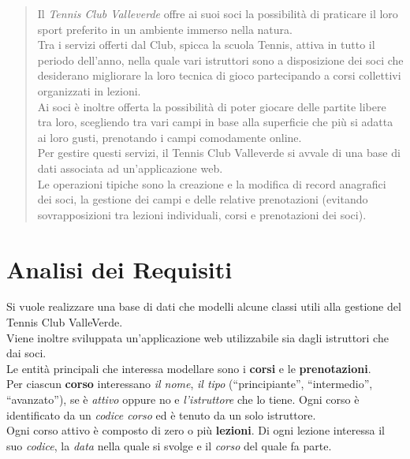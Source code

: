 %
\begin{abstract}
\justify
Il \textit{Tennis Club Valleverde} offre ai suoi soci la possibilità di praticare il loro sport preferito in un ambiente immerso nella natura. \\
Tra i servizi offerti dal Club, spicca la scuola Tennis, attiva in tutto il periodo dell’anno, nella quale vari istruttori sono a  disposizione dei soci che desiderano migliorare la loro tecnica di gioco partecipando a corsi collettivi organizzati in lezioni. \\
Ai soci è inoltre offerta la possibilità di poter giocare delle partite libere tra loro, scegliendo tra vari campi in base alla superficie che più si adatta ai loro gusti, prenotando i campi comodamente online. \\
Per gestire questi servizi, il Tennis Club Valleverde si avvale di una base di dati associata ad un’applicazione web. \\
Le operazioni tipiche sono la creazione e la modifica di record anagrafici dei soci, la gestione dei campi e delle relative prenotazioni (evitando sovrapposizioni tra lezioni individuali, corsi e prenotazioni dei soci).
\end{abstract}

\chapter{Analisi dei Requisiti} 

Si vuole realizzare una base di dati che modelli alcune classi utili alla gestione del Tennis Club ValleVerde.\\ 
Viene inoltre sviluppata un’applicazione web utilizzabile sia dagli istruttori che dai soci.\\

Le entità principali che interessa modellare sono i \textbf{corsi} e le \textbf{prenotazioni}.\\

Per ciascun \textbf{corso} interessano \textit{il nome}, \textit{il tipo} (“principiante”, “intermedio”, “avanzato”), se è \textit{attivo} oppure no e \textit{l'istruttore} che lo tiene. Ogni corso è identificato da un \textit{codice corso} ed è tenuto da un solo istruttore.\\

Ogni corso attivo è composto di zero o più \textbf{lezioni}. Di ogni lezione interessa il suo \textit{codice}, la \textit{data} nella quale si svolge e il \textit{corso} del quale fa parte.\\

